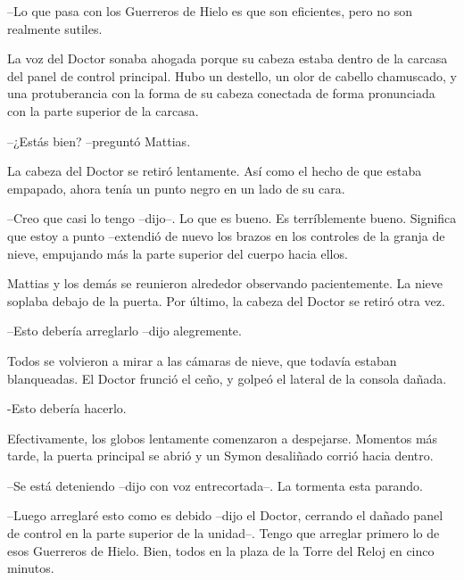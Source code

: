 --Lo que pasa con los Guerreros de Hielo es que son eficientes, pero no son realmente sutiles.



La voz del Doctor sonaba ahogada porque su cabeza estaba dentro de la carcasa del panel de control principal. Hubo un destello, un olor de cabello chamuscado, y una protuberancia con la forma de su cabeza conectada de forma pronunciada con la parte superior de la carcasa.



--¿Estás bien? --preguntó Mattias.



La cabeza del Doctor se retiró lentamente. Así como el hecho de que estaba empapado, ahora tenía un punto negro en un lado de su cara.



--Creo que casi lo tengo --dijo--. Lo que es bueno. Es terríblemente bueno. Significa que estoy a punto --extendió de nuevo los brazos en los controles de la granja de nieve, empujando más la parte superior del cuerpo hacia ellos.



Mattias y los demás se reunieron alrededor observando pacientemente. La nieve soplaba debajo de la puerta. Por último, la cabeza del Doctor se retiró otra vez.



--Esto debería arreglarlo --dijo alegremente.



Todos se volvieron a mirar a las cámaras de nieve, que todavía estaban blanqueadas. El Doctor frunció el ceño, y golpeó el lateral de la consola dañada.


-Esto debería hacerlo.



Efectivamente, los globos lentamente comenzaron a despejarse. Momentos más tarde, la puerta principal se abrió y un Symon desaliñado corrió hacia dentro.



--Se está deteniendo --dijo con voz entrecortada--. La tormenta esta parando.



--Luego arreglaré esto como es debido --dijo el Doctor, cerrando el dañado panel de control en la parte superior de la unidad--. Tengo que arreglar primero lo de esos Guerreros de Hielo. Bien, todos en la plaza de la Torre del Reloj en cinco minutos.



\mbox{}



